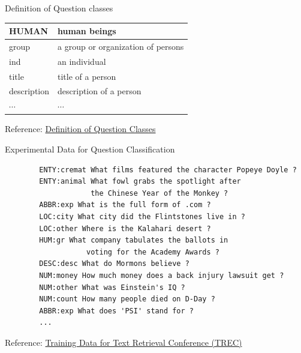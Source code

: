 \begin{frame}[fragile,shrink=20]{Definition of Question classes}
\begin{minipage}[t]{0.49\linewidth}
\begin{tabular}{|>{\raggedright\arraybackslash}m{3cm}|>{\raggedright\arraybackslash}m{3cm}|}
           \hline
           HUMAN & human beings  \\
           \hline
           group & a group or organization of persons  \\
           \hline
           ind & an individual \\
           \hline
           title & title of a person \\
           \hline
           description & description of a person \\
           \hline
           $\cdots$&$\cdots$\\
           \hline
       \end{tabular}
    \end{minipage}
    Reference: \href{https://cogcomp.seas.upenn.edu/Data/QA/QC/definition.html}{Definition of Question Classes}
\end{frame}

\begin{frame}{Experimental Data for Question Classification}
    \small
    \begin{verbatim}
        ENTY:cremat What films featured the character Popeye Doyle ?
        ENTY:animal What fowl grabs the spotlight after
                    the Chinese Year of the Monkey ?
        ABBR:exp What is the full form of .com ?
        LOC:city What city did the Flintstones live in ?
        LOC:other Where is the Kalahari desert ?
        HUM:gr What company tabulates the ballots in
                   voting for the Academy Awards ?
        DESC:desc What do Mormons believe ?
        NUM:money How much money does a back injury lawsuit get ?
        NUM:other What was Einstein's IQ ?
        NUM:count How many people died on D-Day ?
        ABBR:exp What does 'PSI' stand for ?
        ...
    \end{verbatim}
    Reference: \href{https://cogcomp.seas.upenn.edu/Data/QA/QC/}{Training Data for Text Retrieval Conference (TREC)}
\end{frame}

